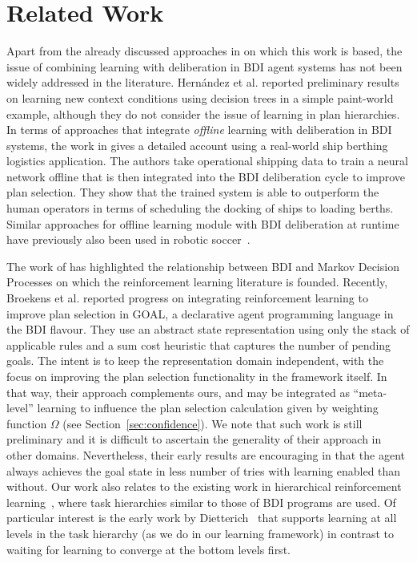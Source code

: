\section{Related Work}\label{sec:relatedwork}


Apart from the already discussed approaches in \cite{airiau09:enhancing,singh10:extending,singh10:learning} on which this work is based, the issue of combining learning with deliberation in BDI agent systems has not been widely addressed in the literature. 
%
Hern\'andez et al. \cite{hernandez04:learning} reported preliminary results on learning new context conditions using decision trees in a simple paint-world example, although they do not consider the issue of learning in plan hierarchies. In terms of approaches that integrate \emph{offline} learning with deliberation in BDI systems, the work in \cite{lokuge07:improving} gives a detailed account using a real-world ship berthing logistics application. The authors take operational shipping data to train a neural network offline that is then integrated into the BDI deliberation cycle to improve plan selection. They show that the trained system is able to outperform the human operators in terms of scheduling the docking of ships to loading berths. Similar approaches for offline learning module with BDI deliberation at runtime have previously also been used in robotic  soccer~\cite{riedmiller01:karlsruhe,brusey02:learning}.



The work of \cite{simari06:relationship} has highlighted the relationship between BDI and Markov Decision Processes on which the reinforcement learning literature is founded. 
%
Recently, Broekens et al. \cite{broekens10:reinforcement} reported progress on integrating reinforcement learning to improve plan selection in GOAL, a declarative agent programming language in the BDI flavour. They use an abstract state representation using only the stack of applicable rules and a sum cost heuristic that captures the number of pending goals. The intent is to keep the representation domain independent, with the focus on improving the plan selection functionality in the framework itself. In that way, their approach complements ours, and may be integrated as ``meta-level'' learning to influence the plan selection calculation given by weighting function $\Omega$ (see Section~\ref{sec:confidence}). We note that such work is still preliminary and it is difficult to ascertain the generality of their approach in other domains. Nevertheless, their early results are encouraging in that the agent always achieves the goal state in less number of tries with learning enabled than without.
%
Our work also relates to the existing work in hierarchical reinforcement learning~\cite{barto03:recent}, where task hierarchies similar to those of BDI programs are used. Of particular interest is the early work by Dietterich~\cite{dietterich00:hierarchical} that supports learning at all levels in the task hierarchy (as we do in our learning framework) in contrast to waiting for learning to converge at the bottom levels first.
